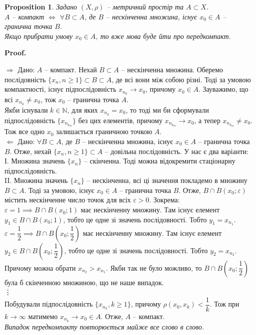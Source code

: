 \documentclass[a4paper, 10pt]{article}
\makeatletter
\def\rightproof{$\boxed{\Rightarrow}$ }
\def\leftproof{$\boxed{\Leftarrow}$ }
\theoremstyle{theoremdd}
\theoremstyle{theoremdd}
\theoremstyle{theoremdd}
\theoremstyle{theoremdd}
\theoremstyle{theoremdd}
\newtheorem{proposition}[theorem]{Proposition}
\theoremstyle{theoremdd}
\theoremstyle{theoremdd}
\theoremstyle{theoremdd}
\renewenvironment{proof}[1][Proof.\\]{\par
\pushQED{\hfill \qed}%
\normalfont \topsep6\p@\@plus6\p@\relax
\trivlist
\item\relax
{\bfseries
#1\@addpunct{.}}\hspace\labelsep\ignorespaces
}{%
\popQED\endtrivlist\@endpefalse
}
\makeatother
\begin{document}
\begin{proposition}
Задано $(X,\rho)$ -- метричний простір та $A \subset X$.\\
$A$ -- компакт $\iff $ $\forall B \subset A$, де $B$ -- нескінченна множина, існує $x_0 \in A$ -- гранична точка $B$.\\
Якщо прибрати умову $x_0 \in A$, то вже мова буде йти про передкомпакт.
\end{proposition}

\begin{proof}
\rightproof Дано: $A$ -- компакт. Нехай $B \subset A$ -- нескінченна множина. Оберемо послідовність $\{x_n, n \geq 1\} \subset B \subset A$, де всі вони між собою різні. Тоді за умовою компактності, існує підпослідовність $x_{n_k} \to x_0$, причому $x_0 \in A$. Зауважимо, що всі $x_{n_k} \neq x_0$, тож $x_0$ -- гранична точка $A$.\\
Якби існували $k \in \mathbb{N}$, для яких $x_{n_k} = x_0$, то тоді ми би сформували підпослідовність $\{x_{n_{k_m}}\}$ без цих елементів, причому $x_{n_{k_m}} \to x_0$, а тепер $x_{n_{k_m}} \neq x_0$. Тож все одно $x_0$ залишається граничною точкою $A$.
\bigskip \\
\leftproof Дано: $\forall B \subset A$, де $B$ -- нескінченна множина, існує $x_0 \in A$ -- гранична точка $B$. Отже, нехай $\{x_n, n \geq 1\} \subset A$ -- довільна послідовність. У нас є два варіанти:\\
I. Множина значень $\{x_n\}$ -- скінченна. Тоді можна відокремити стаціонарну підпослідовність.\\
II. Множина значень $\{x_n\}$ -- нескінченна, всі ці значення покладемо в множину $B \subset A$. Тоді за умовою, існує $x_0 \in A$ -- гранична точка $B$. Отже, $B \cap B(x_0;\varepsilon)$ містить нескінченне число точок для всіх $\varepsilon > 0$. Зокрема:\\
$\varepsilon = 1 \implies B \cap B(x_0;1)$ має нескінченну множину. Там існує елемент $y_1 \in B \cap B(x_0; 1)$, тобто це одне зі значень послідовності. Тобто $y_1 = x_{n_1}$.\\
$\varepsilon = \dfrac{1}{2} \implies B \cap B\left( x_0;\dfrac{1}{2} \right)$ має нескінченну множину. Там існує елемент $y_2 \in B \cap B\left( x_0;\dfrac{1}{2} \right)$, тобто це одне зі значень послідовності. Тобто $y_2 = x_{n_2}$. Причому можна обрати $x_{n_2} > x_{n_1}$. Якби так не було можливо, то $B \cap B\left(x_0; \dfrac{1}{2}\right)$ була б скінченною множиною, що не наше випадок.\\
\vdots \\
Побудували підпослідовність $\{x_{n_k}, k \geq 1\}$, причому $\rho(x_0,x_k) < \dfrac{1}{k}$. Тож при $k \to \infty$ матимемо $x_{n_k} \to x_0 \in A$. Отже, $A$ -- компакт.
\bigskip \\
\textit{Випадок передкомпакту повторюється майже все слово в слово.}
\end{proof}
\end{document}
